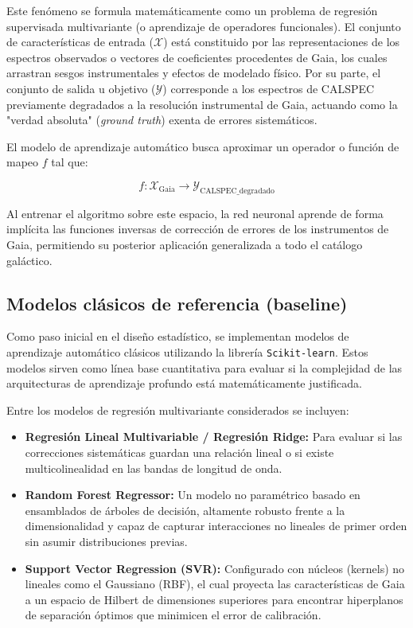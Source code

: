 \documentclass{article}
\begin{document}
Este fenómeno se formula matemáticamente como un problema de regresión supervisada multivariante (o aprendizaje de operadores funcionales). El conjunto de características de entrada ($\mathcal{X}$) está constituido por las representaciones de los espectros observados o vectores de coeficientes procedentes de Gaia, los cuales arrastran sesgos instrumentales y efectos de modelado físico. Por su parte, el conjunto de salida u objetivo ($\mathcal{Y}$) corresponde a los espectros de CALSPEC previamente degradados a la resolución instrumental de Gaia, actuando como la "verdad absoluta" (\textit{ground truth}) exenta de errores sistemáticos.

El modelo de aprendizaje automático busca aproximar un operador o función de mapeo $f$ tal que:

\begin{equation}
f: \mathcal{X}_{\text{Gaia}} \rightarrow \mathcal{Y}_{\text{CALSPEC\_degradado}}
\end{equation}

Al entrenar el algoritmo sobre este espacio, la red neuronal aprende de forma implícita las funciones inversas de corrección de errores de los instrumentos de Gaia, permitiendo su posterior aplicación generalizada a todo el catálogo galáctico.

\subsection{Modelos clásicos de referencia (baseline)}

Como paso inicial en el diseño estadístico, se implementan modelos de aprendizaje automático clásicos utilizando la librería \texttt{Scikit-learn}. Estos modelos sirven como línea base cuantitativa para evaluar si la complejidad de las arquitecturas de aprendizaje profundo está matemáticamente justificada.

Entre los modelos de regresión multivariante considerados se incluyen:
\begin{itemize}
    \item \textbf{Regresión Lineal Multivariable / Regresión Ridge:} Para evaluar si las correcciones sistemáticas guardan una relación lineal o si existe multicolinealidad en las bandas de longitud de onda.
    \item \textbf{Random Forest Regressor:} Un modelo no paramétrico basado en ensamblados de árboles de decisión, altamente robusto frente a la dimensionalidad y capaz de capturar interacciones no lineales de primer orden sin asumir distribuciones previas.
    \item \textbf{Support Vector Regression (SVR):} Configurado con núcleos (kernels) no lineales como el Gaussiano (RBF), el cual proyecta las características de Gaia a un espacio de Hilbert de dimensiones superiores para encontrar hiperplanos de separación óptimos que minimicen el error de calibración.
\end{itemize}
\end{document}
